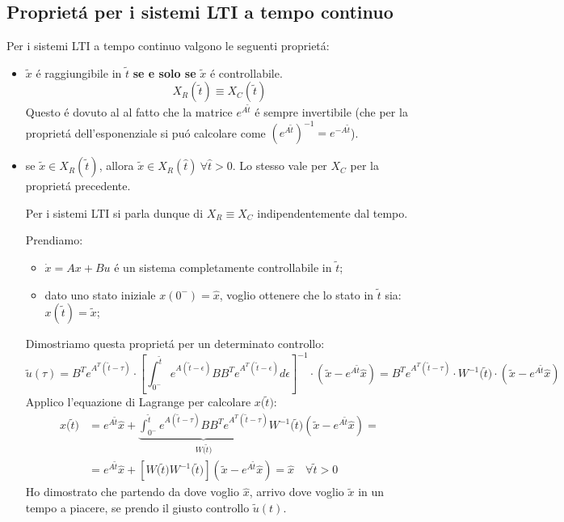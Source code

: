 \documentclass[../main.tex]{subfiles}
\begin{document}
	\subsection{Propriet\'a per i sistemi LTI a tempo continuo}
		Per i sistemi LTI a tempo continuo valgono le seguenti propriet\'a:
		\begin{itemize}
			\item
				$ \tilde x $ \'e raggiungibile in $ \tilde t $ \textbf{se e solo se} $ \tilde x $ \'e controllabile.
				\[
					X_R(\tilde t) \equiv X_C(\tilde t)
				\]
				Questo \'e dovuto al al fatto che la matrice $ e^{A \tilde t} $ \'e sempre invertibile (che per la propriet\'a dell'esponenziale si pu\'o calcolare come $ \left( e^{A \tilde t} \right)^{-1} = e^{-A \tilde t} $).
				
			\item
				se $ \tilde x \in X_R(\tilde t) $, allora $ \tilde x \in X_R(\hat t)\ \forall \hat t > 0 $.
				Lo stesso vale per $ X_C $ per la propriet\'a precedente.
				
				Per i sistemi LTI si parla dunque di $ X_R \equiv X_C $ indipendentemente dal tempo.
				
				Prendiamo:
				\begin{itemize}
					\item
						$ \dot x = A x + B u $ \'e un sistema completamente controllabile in $ \tilde t $;
					\item
						dato uno stato iniziale $ x(0^-) = \hat x $, voglio ottenere che lo stato in $ \tilde t $ sia: $ x(\tilde t) = \tilde x $;
				\end{itemize}
			
				Dimostriamo questa propriet\'a per un determinato controllo:
				\[
					\tilde u(\tau) = B^T e^{A^T (\tilde t - \tau)} \cdot \left[ \int_{0^-}^{\tilde t} e^{A(\tilde t - \epsilon)} B B^T e^{A^T (\tilde t - \epsilon)} d\epsilon \right]^{-1} \cdot \left( \tilde x - e^{A \tilde t} \hat x \right) = B^T e^{A^T (\tilde t - \tau)} \cdot W^{-1}\big( \tilde t \big) \cdot \left( \tilde x - e^{A \tilde t} \hat x \right)
				\]
				Applico l'equazione di Lagrange per calcolare $ x\big( \tilde t \big) $:
				\begin{align*}
					x\big( \tilde t \big) &= e^{A \tilde t} \hat x + \underbrace{\int_{0^-}^{\tilde t} e^{A(\tilde t - \tau)} B B^T e^{A^T (\tilde t - \tau)}}_{W\big( \tilde t \big)} W^{-1}\big( \tilde t \big) \left( \tilde x - e^{A \tilde t} \hat x \right) =
					\\
					&= e^ {A \tilde t} \hat x + \left[ W\big( \tilde t \big) W^{-1}\big( \tilde t \big) \right] \left( \tilde x - e^{A \tilde t} \hat x \right) = \hat x \quad \forall \tilde t > 0
				\end{align*}
				Ho dimostrato che partendo da dove voglio $ \hat x $, arrivo dove voglio $ \tilde x $ in un tempo a piacere, se prendo il giusto controllo $ \tilde u(t) $.
		\end{itemize}
\end{document}
